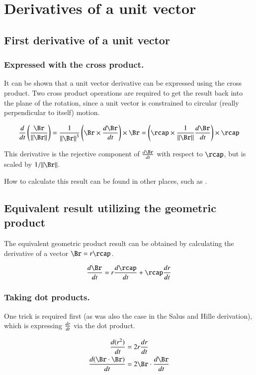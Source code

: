 \chapter{Derivatives of a unit vector}

\section{First derivative of a unit vector}

\subsection{Expressed with the cross product.}

It can be shown that a unit vector derivative can be expressed using the cross product.  Two cross product operations are required to get the result back into the plane of the rotation, since a unit vector is constrained to circular (really perpendicular to itself) motion.

\[
\dt{}\left(\frac{\Br}{\Vert \Br \Vert}\right)
= \frac{1}{{\Vert \Br \Vert}^3}\left(\Br \times \dt{\Br}\right) \times \Br
= \left(\rcap \times \frac{1}{{\Vert \Br \Vert}} \dt{\Br}\right) \times \rcap
\]

This derivative is the rejective component of $\dt{\Br}$ with respect to $\rcap$, but is scaled by $1/\Vert \Br \Vert$.

How to calculate this result can be found in other places, such as
\cite{salas1990coa}.

\section{Equivalent result utilizing the geometric product}

The equivalent geometric product result can be obtained by calculating the derivative of a vector $\Br = r \rcap$.

\[
\dt{\Br} = r \dt{\rcap} + \rcap \dt{r} 
\]

\subsection{Taking dot products.}
One trick is required first (as was also the case in the Salus and Hille derivation), which is expressing $\frac{d {r}}{dt}$ via the dot product.

\begin{align*}
\dt{(r^2)} &= 2r \dt{r} \\
\dt{(\Br \cdot \Br)} &= 2 \Br \cdot \dt{\Br} \\
\end{align*}

